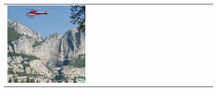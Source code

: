 \begin{figure}[ht!]
\begin{adjustwidth}{-0.8in}{-0.5in}
\begin{tabular}{cccccccccccccccccccc}
\multicolumn{2}{c}{\includegraphics[width=\threebythreecolwidth\textwidth]{figures/cherries/yosemite3.jpg}} &&


\end{tabular}
\end{adjustwidth}
\end{figure}
